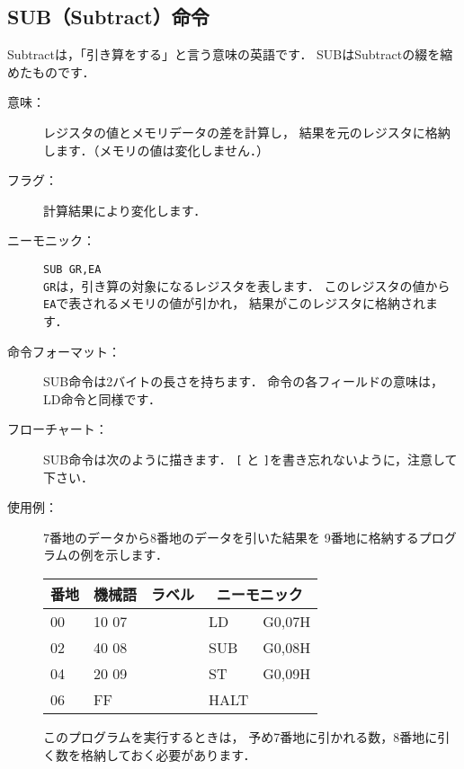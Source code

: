\subsection{SUB（Subtract）命令}
Subtractは，「引き算をする」と言う意味の英語です．
SUBはSubtractの綴を縮めたものです．

\begin{description}
\item[意味：]レジスタの値とメモリデータの差を計算し，
  結果を元のレジスタに格納します．（メモリの値は変化しません．）

\item[フラグ：]計算結果により変化します．

\item[ニーモニック：]\texttt{SUB  GR,EA} \\
  \texttt{GR}は，引き算の対象になるレジスタを表します．
  このレジスタの値から\texttt{EA}で表されるメモリの値が引かれ，
  結果がこのレジスタに格納されます．

\item[命令フォーマット：]SUB命令は2バイトの長さを持ちます．
  命令の各フィールドの意味は，LD命令と同様です．


\item[フローチャート：]SUB命令は次のように描きます．
  \texttt{[} と \texttt{]}を書き忘れないように，注意して下さい．

  \begin{center}
  \end{center}

\item[使用例：]
  7番地のデータから8番地のデータを引いた結果を
  9番地に格納するプログラムの例を示します．

  {\ttfamily\small\begin{center}
    \begin{tabular}{|l|l|l|l l|} \hline
      番地 & 機械語 & ラベル & \multicolumn{2}{|c|}{ニーモニック} \\
      \hline
      00 & 10 07 & & LD   & G0,07H \\
      02 & 40 08 & & SUB  & G0,08H \\
      04 & 20 09 & & ST   & G0,09H \\
      06 & FF    & & HALT & \\
      \hline
    \end{tabular}
  \end{center}}

  このプログラムを実行するときは，
  予め7番地に引かれる数，8番地に引く数を格納しておく必要があります．
\end{description}

